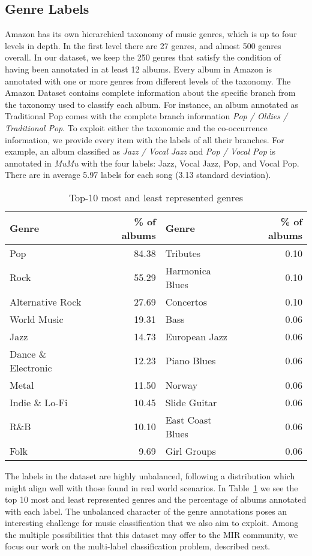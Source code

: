 \documentclass{article}
\begin{document}
\subsection{Genre Labels}\label{sec:taxonomy}

Amazon has its own hierarchical taxonomy of music genres, which is up to four levels in depth.
In the first level there are 27 genres, and almost 500 genres overall. 
In our dataset, we keep the 250 genres that satisfy the condition of having been annotated in at least 12 albums. Every album in Amazon is annotated with one or more genres from different levels of the taxonomy. 
The Amazon Dataset contains complete information about the specific branch from the taxonomy used to classify each album. For instance, an album annotated as Traditional Pop comes with the complete branch information \textit{Pop / Oldies / Traditional Pop}. 
To exploit either the taxonomic and the co-occurrence information, we provide every item with the labels of all their branches. For example, an album classified as \textit{Jazz / Vocal Jazz} and \textit{Pop / Vocal Pop} is annotated in \emph{MuMu} with the four labels: Jazz, Vocal Jazz, Pop, and Vocal Pop. There are in average 5.97 labels for each song (3.13 standard deviation).

\begin{table}[!htp]
\centering
\scriptsize
\caption{Top-10 most and least represented genres}
\label{tbl:genres}
\begin{tabular}{lr|lr}
\toprule
Genre & \% of albums & Genre & \% of albums \\
\midrule
Pop & 84.38 & Tributes & 0.10 \\
Rock & 55.29 & Harmonica Blues & 0.10 \\
Alternative Rock & 27.69 & Concertos & 0.10 \\
World Music & 19.31 & Bass & 0.06 \\
Jazz & 14.73 & European Jazz & 0.06 \\
Dance \& Electronic & 12.23 & Piano Blues & 0.06 \\
Metal & 11.50 & Norway & 0.06 \\
Indie \& Lo-Fi & 10.45 & Slide Guitar & 0.06 \\
R\&B & 10.10& East Coast Blues & 0.06 \\
Folk & 9.69 & Girl Groups & 0.06 \\
\bottomrule
\end{tabular}
\end{table}

The labels in the dataset are highly unbalanced, following a distribution which might align well with those found in real world scenarios. 
In Table~\ref{tbl:genres} we see the top 10 most and least represented genres and the percentage of albums annotated with each label.
The unbalanced character of the genre annotations poses an interesting challenge for music classification that we also aim to exploit. 
Among the multiple possibilities that this dataset may offer to the MIR community, we focus our work on the multi-label classification problem, described next.
\end{document}
